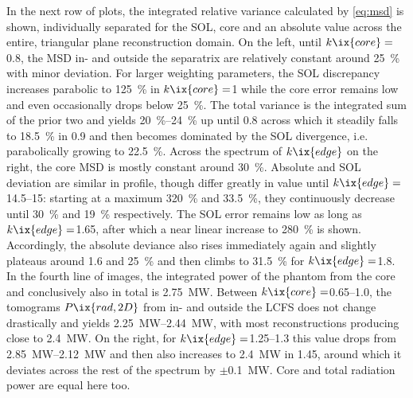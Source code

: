                 In the next row of plots, the integrated relative variance calculated by \cref{eq:msd} is shown, individually separated for the SOL, core and an absolute value across the entire, triangular plane reconstruction domain. On the left, until $k\ix{core}=$\SI{0.8}{\arbitraryunit}, the MSD in- and outside the separatrix are relatively constant around \SI{25}{\percent} with minor deviation. For larger weighting parameters, the SOL discrepancy increases parabolic to \SI{125}{\percent} in $k\ix{core}=$\SI{1}{\arbitraryunit} while the core error remains low and even occasionally drops below \SI{25}{\percent}. The total variance is the integrated sum of the prior two and yields \SIrange{20}{24}{\percent} up until \SI{0.8}{\arbitraryunit} across which it steadily falls to \SI{18.5}{\percent} in \SI{0.9}{\arbitraryunit} and then becomes dominated by the SOL divergence, i.e. parabolically growing to \SI{22.5}{\percent}. Across the spectrum of $k\ix{edge}$ on the right, the core MSD is mostly constant around \SI{30}{\percent}. Absolute and SOL deviation are similar in profile, though differ greatly in value until $k\ix{edge}=$\SIrange{14.5}{15}{\arbitraryunit}: starting at a maximum \SI{320}{\percent} and \SI{33.5}{\percent}, they continuously decrease until \SI{30}{\percent} and \SI{19}{\percent} respectively. The SOL error remains low as long as $k\ix{edge}=$\SI{1.65}{\arbitraryunit}, after which a near linear increase to \SI{280}{\percent} is shown. Accordingly, the absolute deviance also rises immediately again and slightly plateaus around \SI{1.6}{\arbitraryunit} and \SI{25}{\percent} and then climbs to \SI{31.5}{\percent} for $k\ix{edge}=$\SI{1.8}{\arbitraryunit}.\\%
                In the fourth line of images, the integrated power of the phantom from the core and conclusively also in total is \SI{2.75}{\mega\watt}. Between $k\ix{core}=$\SIrange{0.65}{1.0}{\arbitraryunit}, the tomograms $P\ix{rad,2D}$ from in- and outside the LCFS does not change drastically and yields \SIrange{2.25}{2.44}{\mega\watt}, with most reconstructions producing close to \SI{2.4}{\mega\watt}. On the right, for $k\ix{edge}=$\SIrange{1.25}{1.3}{\arbitraryunit} this value drops from \SIrange{2.85}{2.12}{\mega\watt} and then also increases to \SI{2.4}{\mega\watt} in \SI{1.45}{\arbitraryunit}, around which it deviates across the rest of the spectrum by $\pm$\SI{0.1}{\mega\watt}. Core and total radiation power are equal here too.\\%
